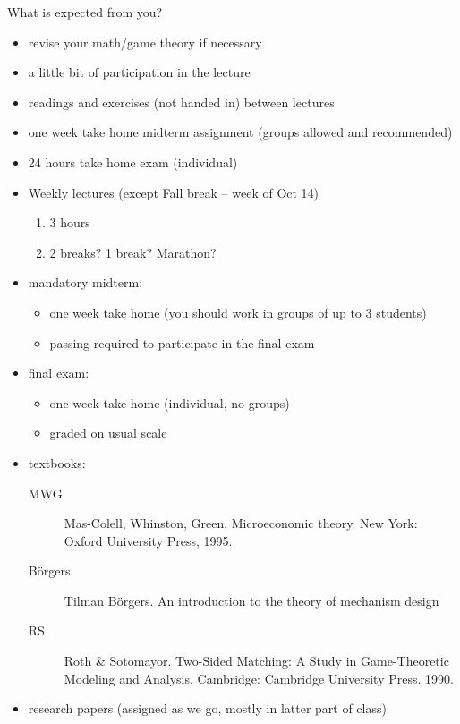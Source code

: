 \documentclass[english]{beamer}		%
\def\lyxframeend{} %
\begin{document}
What is expected from you?
\begin{itemize}
	
	\item revise your math/game theory if necessary
	
	\item a little bit of participation in the lecture
	
	\item readings and exercises (not handed in) between lectures
	
	\item one week take home midterm assignment (groups allowed and recommended)
	
	\item 24 hours take home exam (individual)
	
\end{itemize}
\lyxframeend


\begin{itemize}
	\item Weekly lectures (except Fall break -- week of Oct 14)
	\begin{enumerate}
		\item 3 hours
		\item 2 breaks? 1 break? Marathon?
	\end{enumerate}

	\pause
	\item mandatory midterm:
	\begin{itemize}
		\item one week take home (you should work in groups of up to 3 students)
		\item passing required to participate in the final exam
	\end{itemize}
	
	\item final exam:
	\begin{itemize}
		\item one week take home (individual, no groups)
		\item graded on usual scale
	\end{itemize}
\end{itemize}
\lyxframeend


\begin{itemize}
	\item textbooks:
	\begin{description}
		\item[MWG] Mas-Colell,  Whinston, Green. Microeconomic theory. New York: Oxford University Press, 1995. 
		\item[B\"{o}rgers] Tilman B\"{o}rgers. An introduction to the theory of mechanism design
		\item[RS] Roth \& Sotomayor. Two-Sided Matching: A Study in Game-Theoretic Modeling and Analysis. Cambridge: Cambridge University Press. 1990. 
	\end{description}
	\item research papers (assigned as we go, mostly in latter part of class)
\end{itemize}
\lyxframeend
\end{document}
